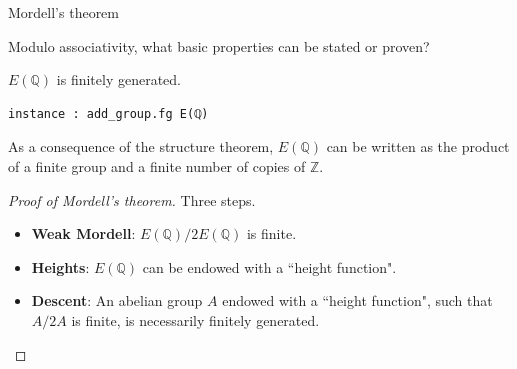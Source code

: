 \documentclass[10pt]{beamer}
\begin{document}
\begin{frame}[fragile, t]{Mordell's theorem}

Modulo associativity, what basic properties can be stated or proven?

\vspace{0.5cm}

\begin{theorem}[Mordell]
$ E(\mathbb{Q}) $ is finitely generated.
\end{theorem}

\begin{lstlisting}[basicstyle=\scriptsize, frame=single]
instance : add_group.fg E(ℚ)
\end{lstlisting}

As a consequence of the structure theorem, $ E(\mathbb{Q}) $ can be written as the product of a finite group and a finite number of copies of $ \mathbb{Z} $.

\vspace{0.5cm}

\begin{proof}[Proof of Mordell's theorem]
Three steps.
\begin{itemize}
\item \textbf{Weak Mordell}: $ E(\mathbb{Q}) / 2E(\mathbb{Q}) $ is finite.
\item \textbf{Heights}: $ E(\mathbb{Q}) $ can be endowed with a ``height function".
\item \textbf{Descent}: An abelian group $ A $ endowed with a ``height function", such that $ A / 2A $ is finite, is necessarily finitely generated.
\end{itemize}
\end{proof}

\end{frame}
\end{document}
